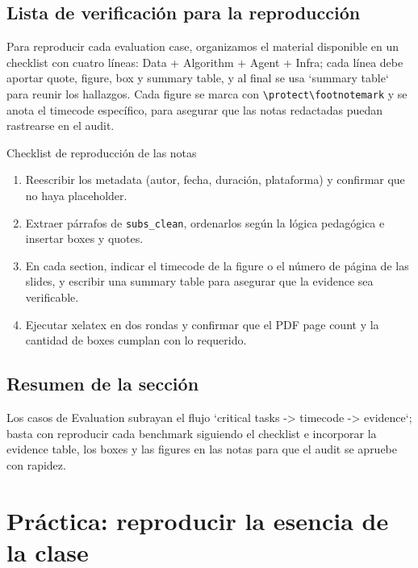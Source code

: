 \documentclass[a4paper]{article}
\begin{document}
\subsection{Lista de verificación para la reproducción}
Para reproducir cada evaluation case, organizamos el material disponible en un checklist con cuatro líneas: Data + Algorithm + Agent + Infra; cada línea debe aportar quote, figure, box y summary table, y al final se usa `summary table` para reunir los hallazgos. Cada figure se marca con \verb|\protect\footnotemark| y se anota el timecode específico, para asegurar que las notas redactadas puedan rastrearse en el audit.

\begin{importantbox}{Checklist de reproducción de las notas}
\begin{enumerate}
    \item Reescribir los metadata (autor, fecha, duración, plataforma) y confirmar que no haya placeholder.
    \item Extraer párrafos de \texttt{subs\_clean}, ordenarlos según la lógica pedagógica e insertar boxes y quotes.
    \item En cada section, indicar el timecode de la figure o el número de página de las slides, y escribir una summary table para asegurar que la evidence sea verificable.
    \item Ejecutar xelatex en dos rondas y confirmar que el PDF page count y la cantidad de boxes cumplan con lo requerido.
\end{enumerate}
\end{importantbox}

\subsection{Resumen de la sección}
Los casos de Evaluation subrayan el flujo `critical tasks -> timecode -> evidence`; basta con reproducir cada benchmark siguiendo el checklist e incorporar la evidence table, los boxes y las figures en las notas para que el audit se apruebe con rapidez.
\section{Práctica: reproducir la esencia de la clase}
\end{document}
